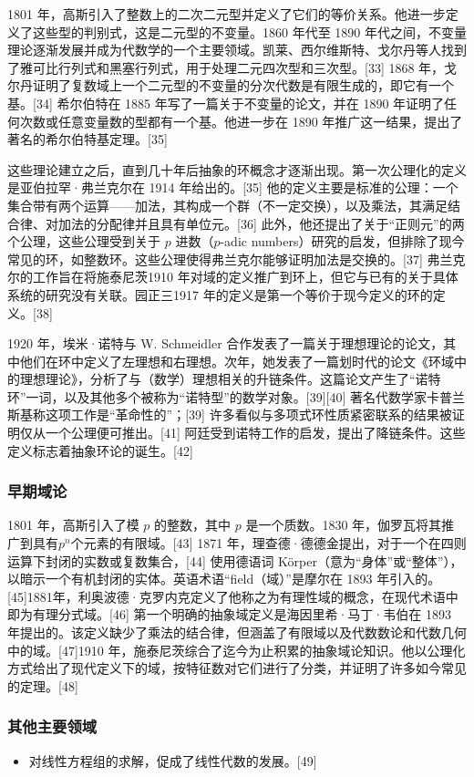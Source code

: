 1801 年，高斯引入了整数上的二次二元型并定义了它们的等价关系。他进一步定义了这些型的判别式，这是二元型的不变量。1860 年代至 1890 年代之间，不变量理论逐渐发展并成为代数学的一个主要领域。凯莱、西尔维斯特、戈尔丹等人找到了雅可比行列式和黑塞行列式，用于处理二元四次型和三次型。[33] 1868 年，戈尔丹证明了复数域上一个二元型的不变量的分次代数是有限生成的，即它有一个基。[34] 希尔伯特在 1885 年写了一篇关于不变量的论文，并在 1890 年证明了任何次数或任意变量数的型都有一个基。他进一步在 1890 年推广这一结果，提出了著名的希尔伯特基定理。[35]

这些理论建立之后，直到几十年后抽象的环概念才逐渐出现。第一次公理化的定义是亚伯拉罕·弗兰克尔在 1914 年给出的。[35] 他的定义主要是标准的公理：一个集合带有两个运算——加法，其构成一个群（不一定交换），以及乘法，其满足结合律、对加法的分配律并且具有单位元。[36] 此外，他还提出了关于“正则元”的两个公理，这些公理受到关于 $p$ 进数（$p$-adic numbers）研究的启发，但排除了现今常见的环，如整数环。这些公理使得弗兰克尔能够证明加法是交换的。[37] 弗兰克尔的工作旨在将施泰尼茨1910 年对域的定义推广到环上，但它与已有的关于具体系统的研究没有关联。园正三1917 年的定义是第一个等价于现今定义的环的定义。[38]

1920 年，埃米·诺特与 W. Schmeidler 合作发表了一篇关于理想理论的论文，其中他们在环中定义了左理想和右理想。次年，她发表了一篇划时代的论文《环域中的理想理论》，分析了与（数学）理想相关的升链条件。这篇论文产生了“诺特环”一词，以及其他多个被称为“诺特型”的数学对象。[39][40] 著名代数学家卡普兰斯基称这项工作是“革命性的”；[39] 许多看似与多项式环性质紧密联系的结果被证明仅从一个公理便可推出。[41] 阿廷受到诺特工作的启发，提出了降链条件。这些定义标志着抽象环论的诞生。[42]
\subsubsection{早期域论}
1801 年，高斯引入了模 $p$ 的整数，其中 $p$ 是一个质数。1830 年，伽罗瓦将其推广到具有$p^n$个元素的有限域。[43] 1871 年，理查德·德德金提出，对于一个在四则运算下封闭的实数或复数集合，[44] 使用德语词 Körper（意为“身体”或“整体”），以暗示一个有机封闭的实体。英语术语“field（域）”是摩尔在 1893 年引入的。[45]1881年，利奥波德·克罗内克定义了他称之为有理性域的概念，在现代术语中即为有理分式域。[46] 第一个明确的抽象域定义是海因里希·马丁·韦伯在 1893 年提出的。该定义缺少了乘法的结合律，但涵盖了有限域以及代数数论和代数几何中的域。[47]1910 年，施泰尼茨综合了迄今为止积累的抽象域论知识。他以公理化方式给出了现代定义下的域，按特征数对它们进行了分类，并证明了许多如今常见的定理。[48]
\subsubsection{其他主要领域}
\begin{itemize}
\item 对线性方程组的求解，促成了线性代数的发展。[49]
\end{itemize}
